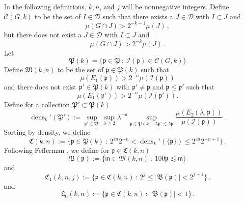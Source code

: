 \documentclass[10pt,a4paper]{article}
\theoremstyle{plain}
\theoremstyle{definition}
\numberwithin{equation}{subsection}
\DeclareMathOperator{\dens}{\operatorname{dens}}
\newcommand{\fp}{{\mathfrak p}}
\newcommand{\fP}{{\mathfrak P}}
\newcommand{\fL}{{\mathfrak L}}
\newcommand{\fC}{{\mathfrak C}}
\newcommand{\scI}{{\mathcal{I}}} %
\begin{document}
In the following definitions, $k, n$, and
$j$ will be nonnegative integers.
Define
$\mathcal{C}(G,k)$ to be the set of $I\in \mathcal{D}$
such that there exists a $J\in \mathcal{D}$ with $I\subset J$
and
\begin{equation}\label{muhj1}
   {\mu(G \cap J)} > 2^{-k-1}{\mu(J)}\, ,
\end{equation}
but there does not exist a $J\in \mathcal{D}$ with $I\subset J$ and
\begin{equation}\label{muhj2}
   {\mu(G \cap J)} > 2^{-k}{\mu(J)}\,.
\end{equation}
Let
\begin{equation}
    \label{eq-defPk}
    \fP(k)=\{\fp\in \fP \ : \ \scI(\fp)\in \mathcal{C}(G,k)\}
\end{equation}
Define $ {\mathfrak{M}}(k,n)$ to be the set of $\fp \in \fP(k)$ such that
 \begin{equation}\label{ebardense}
    \mu({E_1}(\fp)) > 2^{-n} \mu(\scI(\fp))
 \end{equation}
and there does not exist $\fp'\in \fP(k)$ with
$\fp'\neq \fp$ and $\fp\le \fp'$ such that
 \begin{equation}\label{mnkmax}
    \mu({E_1}(\fp')) > 2^{-n} \mu(\scI(\fp')).
 \end{equation}
Define for a collection $\fP'\subset \fP(k)$
\begin{equation}
    \label{eq-densdef}
   \dens_k' (\fP'):= \sup_{\fp'\in \fP'}\sup_{\lambda \geq 2} \lambda^{-a} \sup_{\fp \in \fP(k): \lambda \fp' \lesssim \lambda \fp}
    \frac{\mu({E}_2(\lambda, \fp))}{\mu(\scI(\fp))}\,.
\end{equation}
Sorting by density, we define
\begin{equation}
    \label{def-cnk}
    \fC(k,n):=\{\fp\in \fP(k) \ : \
    2^{4a}2^{-n}< \dens_k'(\{\fp\}) \le
    2^{4a}2^{-n+1}\}\,.
\end{equation}
Following Fefferman \cite{fefferman}, we
define for $\fp \in \fC(k,n)$
\begin{equation}\label{defbfp}
     \mathfrak{B}(\fp) := \{ \mathfrak{m} \in \mathfrak{M}(k,n) \ : \ 100 \fp \lesssim \mathfrak{m}\}
\end{equation}
and
\begin{equation}\label{defcnkj}
       \fC_1(k,n,j) := \{\fp \in \fC(k,n) \ : \ 2^{j} \leq |\mathfrak{B}(\fp)| < 2^{j+1}\}\,.
\end{equation}
and
\begin{equation}\label{defl0nk}
       \fL_0(k,n) := \{\fp \in \fC(k,n) \ : \ |\mathfrak{B}(\fp)| <1\}\,.
\end{equation}
\end{document}
